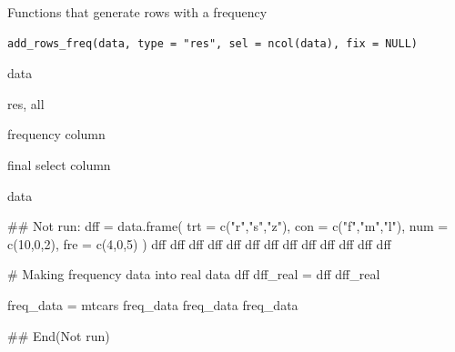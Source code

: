 \documentclass[a4paper]{book}
\begin{document}
%
\begin{Description}
Functions that generate rows with a frequency
\end{Description}
%
\begin{Usage}
\begin{verbatim}
add_rows_freq(data, type = "res", sel = ncol(data), fix = NULL)
\end{verbatim}
\end{Usage}
%
\begin{Arguments}
\begin{ldescription}
\item[\code{data}] data

\item[\code{type}] res, all

\item[\code{sel}] frequency column

\item[\code{fix}] final select column
\end{ldescription}
\end{Arguments}
%
\begin{Value}
data
\end{Value}
%
\begin{Examples}
\begin{ExampleCode}

\#\# Not run: 
dff = data.frame(
  trt = c("r","s","z"),
  con = c("f","m","l"),
  num = c(10,0,2),
  fre = c(4,0,5) )
dff
dff %
dff %
dff %
dff %
dff %
dff %
dff %
dff %
dff %
dff %
dff %
dff %


# Making frequency data into real data
dff %
 dff_real =  dff %
 dff_real


 freq_data =  mtcars %
 freq_data%
 freq_data%
 freq_data%



## End(Not run)


\end{ExampleCode}
\end{Examples}
\end{document}
